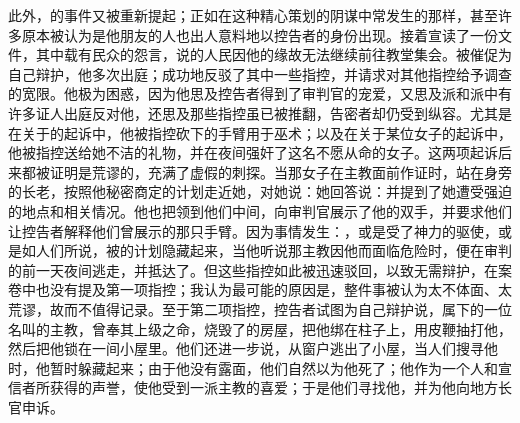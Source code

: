 此外，的事件又被重新提起；正如在这种精心策划的阴谋中常发生的那样，甚至许多原本被认为是他朋友的人也出人意料地以控告者的身份出现。接着宣读了一份文件，其中载有民众的怨言，说的人民因他的缘故无法继续前往教堂集会。被催促为自己辩护，他多次出庭；成功地反驳了其中一些指控，并请求对其他指控给予调查的宽限。他极为困惑，因为他思及控告者得到了审判官的宠爱，又思及派和派中有许多证人出庭反对他，还思及那些指控虽已被推翻，告密者却仍受到纵容。尤其是在关于的起诉中，他被指控砍下的手臂用于巫术；以及在关于某位女子的起诉中，他被指控送给她不洁的礼物，并在夜间强奸了这名不愿从命的女子。这两项起诉后来都被证明是荒谬的，充满了虚假的刺探。当那女子在主教面前作证时，站在身旁的长老，按照他秘密商定的计划走近她，对她说：她回答说：并提到了她遭受强迫的地点和相关情况。他也把领到他们中间，向审判官展示了他的双手，并要求他们让控告者解释他们曾展示的那只手臂。因为事情发生：，或是受了神力的驱使，或是如人们所说，被的计划隐藏起来，当他听说那主教因他而面临危险时，便在审判的前一天夜间逃走，并抵达了。但这些指控如此被迅速驳回，以致无需辩护，在案卷中也没有提及第一项指控；我认为最可能的原因是，整件事被认为太不体面、太荒谬，故而不值得记录。至于第二项指控，控告者试图为自己辩护说，属下的一位名叫的主教，曾奉其上级之命，烧毁了的房屋，把他绑在柱子上，用皮鞭抽打他，然后把他锁在一间小屋里。他们还进一步说，从窗户逃出了小屋，当人们搜寻他时，他暂时躲藏起来；由于他没有露面，他们自然以为他死了；他作为一个人和宣信者所获得的声誉，使他受到一派主教的喜爱；于是他们寻找他，并为他向地方长官申诉。\newline{}\par

